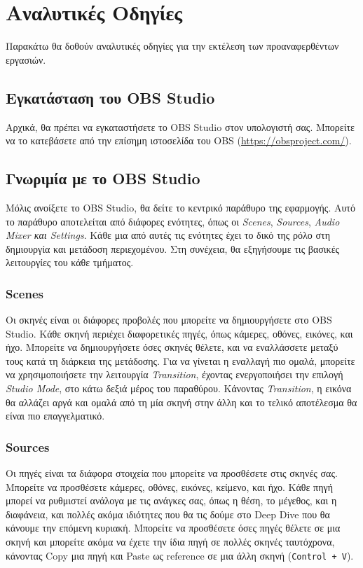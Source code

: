 \documentclass[12pt,a4paper]{article}
\begin{document}
\section{Αναλυτικές Οδηγίες}
Παρακάτω θα δοθούν αναλυτικές οδηγίες για την εκτέλεση των προαναφερθέντων εργασιών.
\subsection{Εγκατάσταση του OBS Studio}
Αρχικά, θα πρέπει να εγκαταστήσετε το OBS Studio στον υπολογιστή σας.
Μπορείτε να το κατεβάσετε από την επίσημη ιστοσελίδα του OBS (\url{https://obsproject.com/}).
\subsection{Γνωριμία με το OBS Studio}
Μόλις ανοίξετε το OBS Studio, θα δείτε το κεντρικό παράθυρο της εφαρμογής. Αυτό το παράθυρο
αποτελείται από διάφορες ενότητες, όπως οι \textit{Scenes}, \textit{Sources}, \textit{Audio Mixer
  και \textit{Settings}}. Κάθε μια από αυτές τις ενότητες έχει το δικό της ρόλο στη δημιουργία
και μετάδοση περιεχομένου. Στη συνέχεια, θα εξηγήσουμε τις βασικές λειτουργίες του κάθε τμήματος.
\subsubsection{Scenes}
Οι σκηνές είναι οι διάφορες προβολές που μπορείτε να δημιουργήσετε στο OBS Studio. Κάθε σκηνή
περιέχει διαφορετικές πηγές, όπως κάμερες, οθόνες, εικόνες, και ήχο. Μπορείτε να δημιουργήσετε
όσες σκηνές θέλετε, και να εναλλάσσετε μεταξύ τους κατά τη διάρκεια της μετάδοσης. Για να
γίνεται η εναλλαγή πιο ομαλά, μπορείτε να χρησιμοποιήσετε την λειτουργία \textit{Transition},
έχοντας ενεργοποιήσει την επιλογή \textit{Studio Mode}, στο κάτω δεξιά μέρος του παραθύρου. Κάνοντας
\textit{Transition}, η εικόνα θα αλλάζει αργά και ομαλά από τη μία σκηνή στην άλλη και το τελικό
αποτέλεσμα θα είναι πιο επαγγελματικό.
\subsubsection{Sources}
Οι πηγές είναι τα διάφορα στοιχεία που μπορείτε να προσθέσετε στις σκηνές σας. Μπορείτε να
προσθέσετε κάμερες, οθόνες, εικόνες, κείμενο, και ήχο. Κάθε πηγή μπορεί να ρυθμιστεί ανάλογα
με τις ανάγκες σας, όπως η θέση, το μέγεθος, και η διαφάνεια, και πολλές ακόμα ιδιότητες που θα τις
δούμε στο Deep Dive που θα κάνουμε την επόμενη κυριακή. Μπορείτε να προσθέσετε όσες πηγές θέλετε σε
μια σκηνή και μπορείτε ακόμα να έχετε την ίδια πηγή σε πολλές σκηνές ταυτόχρονα, κάνοντας Copy μια πηγή
και Paste ως reference σε μια άλλη σκηνή (\texttt{Control + V}).
\end{document}
